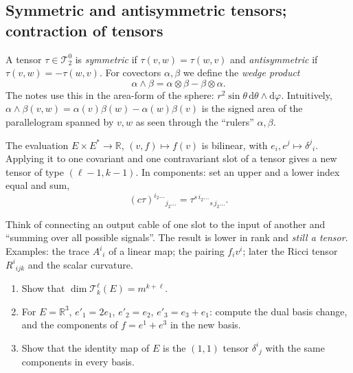 \documentclass[11pt,a4paper]{article}
\newcommand{\subhead}[1]{\par\medskip\noindent{\bfseries #1}\par\nobreak\smallskip}
\numberwithin{equation}{section}
\theoremstyle{definition}
\theoremstyle{plain}
\newcommand{\R}{\mathbb{R}}
\newcommand{\dd}{\mathrm{d}}
\newcommand{\TT}[2]{\mathcal{T}^{#1}_{#2}}          %
\begin{document}
\subsection{Symmetric and antisymmetric tensors; contraction of tensors}\label{sec:symcontr}
A tensor $\tau\in\TT{0}{2}$ is \emph{symmetric} if $\tau(v,w)=\tau(w,v)$ and \emph{antisymmetric} if $\tau(v,w)=-\tau(w,v)$. For covectors $\alpha,\beta$ we define the \emph{wedge product}
\[
\alpha\wedge\beta=\alpha\otimes\beta-\beta\otimes\alpha.
\]
The notes use this in the area-form of the sphere: $r^2\sin\theta\,\dd\theta\wedge\dd\varphi$. Intuitively, $\alpha\wedge\beta(v,w)=\alpha(v)\beta(w)-\alpha(w)\beta(v)$ is the signed area of the parallelogram spanned by $v,w$ as seen through the ``rulers'' $\alpha,\beta$.

\subhead{Contraction}
\begin{formal}[{contraction}]
The evaluation $E\times E^*\to\R$, $(v,f)\mapsto f(v)$ is bilinear, with $e_i,e^{j}\mapsto\delta^j{}_i$. Applying it to one covariant and one contravariant slot of a tensor gives a new tensor of type $(\ell-1,k-1)$. In components: set an upper and a lower index equal and sum,
\[
(c\tau)^{i_2\dots}{}_{j_2\dots}=\tau^{s\,i_2\dots}{}_{s\,j_2\dots}.
\]
\end{formal}
\begin{intuition}[{contraction = plug a vector-slot into a covector-slot}]
Think of connecting an output cable of one slot to the input of another and ``summing over all possible signals''. The result is lower in rank and \emph{still a tensor}. Examples: the trace $A^i{}_i$ of a linear map; the pairing $f_iv^i$; later the Ricci tensor $R^i{}_{ijk}$ and the scalar curvature.
\end{intuition}

\begin{exercises}
\begin{enumerate}[nosep]
\item Show that $\dim\TT{\ell}{k}(E)=m^{k+\ell}$.
\item For $E=\R^3$, $e'_1=2e_1$, $e'_2=e_2$, $e'_3=e_3+e_1$: compute the dual basis change, and the components of $f=e^{1}+e^{3}$ in the new basis.
\item Show that the identity map of $E$ is the $(1,1)$ tensor $\delta^i{}_j$ with the same components in every basis.
\end{enumerate}
\end{exercises}
\end{document}
